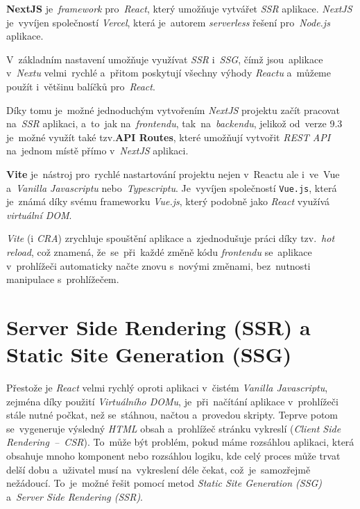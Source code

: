 \documentclass[11pt,a4paper]{report}
\begin{document}
            \textbf{NextJS} je~\emph{framework} pro~\emph{React}, který umožňuje vytvářet \emph{SSR} aplikace. \emph{NextJS} je~vyvíjen společností \emph{Vercel}, která je~autorem \emph{serverless} řešení pro~\emph{Node.js} aplikace.

            V~základním nastavení umožňuje využívat \emph{SSR} i~\emph{SSG}, čímž jsou~aplikace v~\emph{Nextu} velmi~rychlé a~přitom poskytují všechny výhody \emph{Reactu} a~můžeme použít i~většinu balíčků pro~\emph{React}.

            Díky tomu je~možné jednoduchým vytvořením \emph{NextJS} projektu začít pracovat na~\emph{SSR} aplikaci, a~to~jak na~\emph{frontendu}, tak~na~\emph{backendu}, jelikož od~verze 9.3 je~možné využít také tzv.\textbf{API Routes}, které umožňují vytvořit \emph{REST API} na~jednom místě přímo v~\emph{NextJS} aplikaci. \cite{nextjs, nextjs-api-routes, nextjs-changelog-9-3}

            \textbf{Vite} je~nástroj pro~rychlé nastartování projektu nejen v~Reactu ale i~ve~Vue a~\emph{Vanilla Javascriptu} nebo~\emph{Typescriptu}. Je~vyvíjen společností \texttt{Vue.js}, která je~známá díky svému frameworku \emph{Vue.js}, který podobně jako \emph{React} využívá \emph{virtuální DOM}.

            \emph{Vite} (i \emph{CRA}) zrychluje spouštění aplikace a~zjednodušuje práci díky tzv.~\emph{hot reload}, což znamená, že~se~při~každé změně kódu \emph{frontendu} se~aplikace v~prohlížeči automaticky načte znovu s~novými změnami, bez~nutnosti manipulace s~prohlížečem. \cite{vitejs}

        \section{Server Side Rendering (SSR) a Static Site Generation (SSG)}
            Přestože je \emph{React} velmi rychlý oproti aplikaci v~čistém \emph{Vanilla Javascriptu}, zejména díky použití \emph{Virtuálního DOMu}, je~při~načítání aplikace v~prohlížeči stále nutné počkat, než se~stáhnou, načtou a~provedou skripty. Teprve potom se~vygeneruje výsledný \emph{HTML} obsah a~prohlížeč stránku vykreslí (\emph{Client Side Rendering~--~CSR})\cite{mediumWhatCSR}. To~může být problém, pokud máme rozsáhlou aplikaci, která obsahuje mnoho komponent nebo rozsáhlou logiku, kde celý proces může trvat delší dobu a~uživatel musí na~vykreslení déle čekat, což~je~samozřejmě nežádoucí. To~je~možné řešit pomocí metod \emph{Static Site Generation (SSG)} a~\emph{Server Side Rendering (SSR)}.
\end{document}
